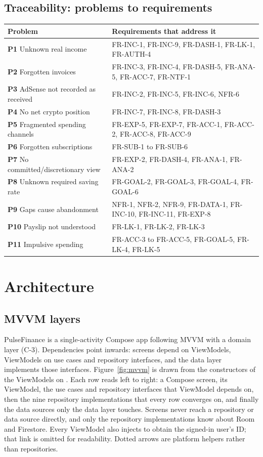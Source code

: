 \documentclass[11pt,a4paper]{article}
\newcommand{\prob}[1]{\textsf{\textbf{\color{pfamberdark}#1}}}
\begin{document}
\subsection{Traceability: problems to requirements}
\begin{tabularx}{\textwidth}{|>{\raggedright\arraybackslash}p{5.2cm}|L|}
\hline
\textbf{Problem} & \textbf{Requirements that address it}\\
\hline
\prob{P1} Unknown real income & FR-INC-1, FR-INC-9, FR-DASH-1, FR-LK-1, FR-AUTH-4\\
\prob{P2} Forgotten invoices & FR-INC-3, FR-INC-4, FR-DASH-5, FR-ANA-5, FR-ACC-7, FR-NTF-1\\
\prob{P3} AdSense not recorded as received & FR-INC-2, FR-INC-5, FR-INC-6, NFR-6\\
\prob{P4} No net crypto position & FR-INC-7, FR-INC-8, FR-DASH-3\\
\prob{P5} Fragmented spending channels & FR-EXP-5, FR-EXP-7, FR-ACC-1, FR-ACC-2, FR-ACC-8, FR-ACC-9\\
\prob{P6} Forgotten subscriptions & FR-SUB-1 to FR-SUB-6\\
\prob{P7} No committed/discretionary view & FR-EXP-2, FR-DASH-4, FR-ANA-1, FR-ANA-2\\
\prob{P8} Unknown required saving rate & FR-GOAL-2, FR-GOAL-3, FR-GOAL-4, FR-GOAL-6\\
\prob{P9} Gaps cause abandonment & NFR-1, NFR-2, NFR-9, FR-DATA-1, FR-INC-10, FR-INC-11, FR-EXP-8\\
\prob{P10} Payslip not understood & FR-LK-1, FR-LK-2, FR-LK-3\\
\prob{P11} Impulsive spending & FR-ACC-3 to FR-ACC-5, FR-GOAL-5, FR-LK-4, FR-LK-5\\
\hline
\end{tabularx}

\section{Architecture}
\label{sec:architecture}

\subsection{MVVM layers}
PulseFinance is a single-activity Compose app following MVVM with a domain layer (C-3). Dependencies point inwards: screens depend on ViewModels, ViewModels on use cases and repository interfaces, and the data layer implements those interfaces. Figure~\ref{fig:mvvm} is drawn from the constructors of the ViewModels on . Each row reads left to right: a Compose screen, its ViewModel, the use cases and repository interfaces that ViewModel depends on, then the nine repository implementations that every row converges on, and finally the data sources only the data layer touches. Screens never reach a repository or data source directly, and only the repository implementations know about Room and Firestore. Every ViewModel also injects  to obtain the signed-in user's ID; that link is omitted for readability. Dotted arrows are platform helpers rather than repositories.
\end{document}
